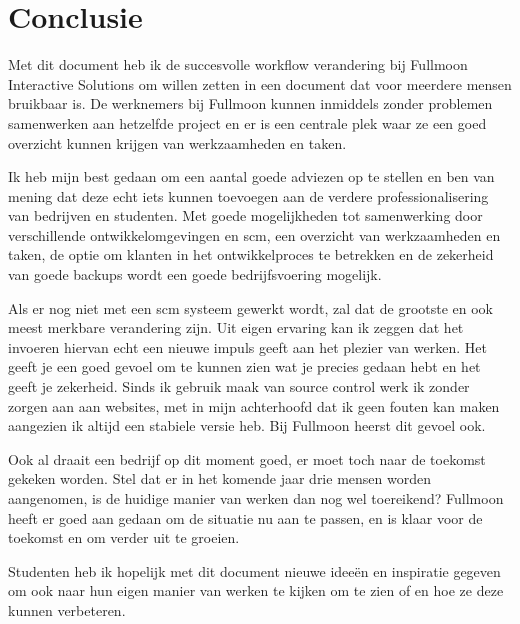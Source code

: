 \chapter{Conclusie}

Met dit document heb ik de succesvolle workflow verandering bij Fullmoon Interactive Solutions om willen zetten in een document dat voor meerdere mensen bruikbaar is. De werknemers bij Fullmoon kunnen inmiddels zonder problemen samenwerken aan hetzelfde project en er is een centrale plek waar ze een goed overzicht kunnen krijgen van werkzaamheden en taken.

Ik heb mijn best gedaan om een aantal goede adviezen op te stellen en ben van mening dat deze echt iets kunnen toevoegen aan de verdere professionalisering van bedrijven en studenten. Met goede mogelijkheden tot samenwerking door verschillende ontwikkelomgevingen en {\sc scm}, een overzicht van werkzaamheden en taken, de optie om klanten in het ontwikkelproces te betrekken en de zekerheid van goede backups wordt een goede bedrijfsvoering mogelijk.

Als er nog niet met een {\sc scm} systeem gewerkt wordt, zal dat de grootste en ook meest merkbare verandering zijn. Uit eigen ervaring kan ik zeggen dat het invoeren hiervan echt een nieuwe impuls geeft aan het plezier van werken. Het geeft je een goed gevoel om te kunnen zien wat je precies gedaan hebt en het geeft je zekerheid. Sinds ik gebruik maak van source control werk ik zonder zorgen aan aan websites, met in mijn achterhoofd dat ik geen fouten kan maken aangezien ik altijd een stabiele versie heb. Bij Fullmoon heerst dit gevoel ook.

Ook al draait een bedrijf op dit moment goed, er moet toch naar de toekomst gekeken worden. Stel dat er in het komende jaar drie mensen worden aangenomen, is de huidige manier van werken dan nog wel toereikend? Fullmoon heeft er goed aan gedaan om de situatie nu aan te passen, en is klaar voor de toekomst en om verder uit te groeien.

Studenten heb ik hopelijk met dit document nieuwe ideeën en inspiratie gegeven om ook naar hun eigen manier van werken te kijken om te zien of en hoe ze deze kunnen verbeteren.